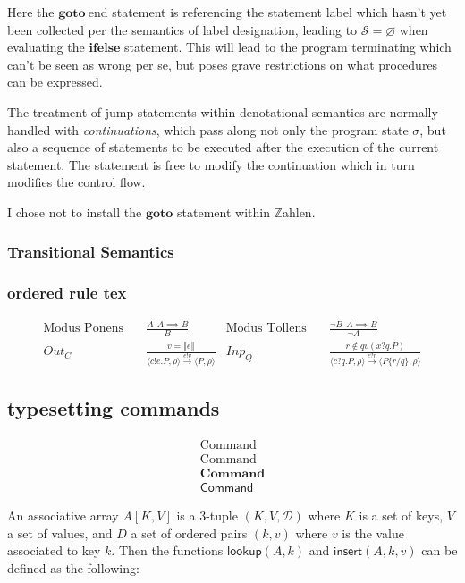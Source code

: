 \documentclass{article}
\begin{document}
	Here the $\mathbf{goto} \ \text{end}$ statement is referencing the statement label  which hasn't yet been collected per the semantics of label designation, leading to $\mathcal{S} = \varnothing$ when evaluating the $\mathbf{ifelse}$ statement. This will lead to the program terminating which can't be seen as wrong per se, but poses grave restrictions on what procedures can be expressed.
	
	The treatment of jump statements within denotational semantics are normally handled with \emph{continuations}, which pass along not only the program state $\sigma$, but also a sequence of statements to be executed after the execution of the current statement. The statement is free to modify the continuation which in turn modifies the control flow.
	
	I chose not to install the $\mathbf{goto}$ statement within $\mathbb{Z}$ahlen.
	
	\subsubsection{Transitional Semantics}
	
	\subsubsection{ordered rule tex}
	
	\begin{align*}
		\text{Modus Ponens} & \quad \frac{A \ \ A \implies B}{B} 
		&  \text{Modus Tollens} & \quad \frac{\neg B \ \ A \implies B}{\neg A} \\
		Out_{C} & \quad\frac{v = \llbracket e\rrbracket}{\langle c!e.P,\rho\rangle\xrightarrow{e!v}\langle P,\rho\rangle} & Inp_{Q} & \quad\frac{r\not\in qv(x?q.P)}{\langle c?q.P,\rho\rangle\xrightarrow{c?r}\langle P\{r/q\},\rho\rangle}
	\end{align*}
	
	\subsection{typesetting commands}
	
	\begin{align*}
		\text{Command} \\
		\mathrm{Command} \\
		\mathbf{Command} \\
		\mathsf{Command}
	\end{align*}
	
	An associative array $A[K, V]$ is a 3-tuple $(K, V, \mathcal{D})$ where $K$ is a set of keys, $V$ a set of values, and $D$ a set of ordered pairs $(k, v)$ where $v$ is the value associated to key $k$. Then the functions $\mathsf{lookup}(A, k)$ and $\mathsf{insert}(A, k, v)$ can be defined as the following:
	
\end{document}
